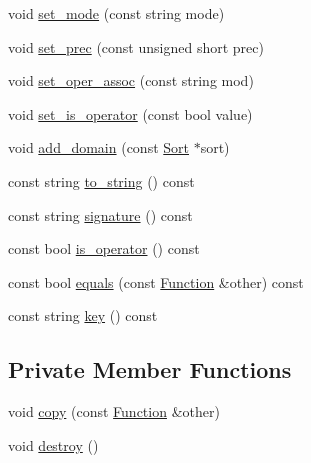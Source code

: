 \begin{DoxyCompactItemize}
\item 
void \hyperlink{classgenevalmag_1_1Function_a90ff82b99ca7a8bd4795a8c7b6a26ac9}{set\_\-mode} (const string mode)
\item 
void \hyperlink{classgenevalmag_1_1Function_a56dbc3c8050d207b3fb5542d227326b7}{set\_\-prec} (const unsigned short prec)
\item 
void \hyperlink{classgenevalmag_1_1Function_a5bf49ede4083dc9621eae9ff8e8b9418}{set\_\-oper\_\-assoc} (const string mod)
\item 
void \hyperlink{classgenevalmag_1_1Function_a0814d3aa8b3034c5e415b0dacd65a059}{set\_\-is\_\-operator} (const bool value)
\item 
void \hyperlink{classgenevalmag_1_1Function_a283f269af558ded12c3dd51a7edb774a}{add\_\-domain} (const \hyperlink{classgenevalmag_1_1Sort}{Sort} $\ast$sort)
\item 
const string \hyperlink{classgenevalmag_1_1Function_ae730b6f7f0108383e1acbdde13813585}{to\_\-string} () const 
\item 
const string \hyperlink{classgenevalmag_1_1Function_a13bd09282fcdf0edec0b8881939d6928}{signature} () const 
\item 
const bool \hyperlink{classgenevalmag_1_1Function_a011d344c0a5d6fc3d1d851967028010a}{is\_\-operator} () const 
\item 
const bool \hyperlink{classgenevalmag_1_1Function_a4a9007a5fc8a9e4781144b580e127109}{equals} (const \hyperlink{classgenevalmag_1_1Function}{Function} \&other) const 
\item 
const string \hyperlink{classgenevalmag_1_1Function_ab1928425174bc0856db6a7d700061fca}{key} () const 
\end{DoxyCompactItemize}
\subsection*{Private Member Functions}
\begin{DoxyCompactItemize}
\item 
void \hyperlink{classgenevalmag_1_1Function_a3a30e9b7d22c2426c34b025bc460ecda}{copy} (const \hyperlink{classgenevalmag_1_1Function}{Function} \&other)
\item 
void \hyperlink{classgenevalmag_1_1Function_a280800ca78b087d0d098bc89fe7b5190}{destroy} ()
\end{DoxyCompactItemize}
